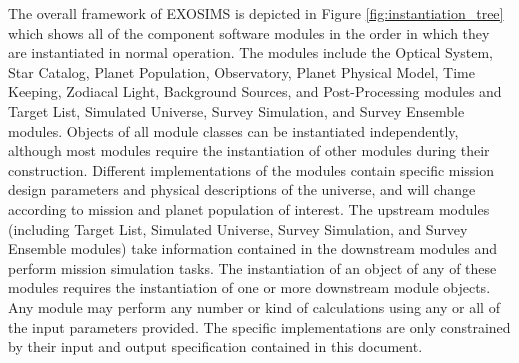 \documentclass[cleanfoot]{asme2ej}
\newcommand{\reffig}[1]{Figure \ref{#1}}
\begin{document}

The overall framework of EXOSIMS is depicted in \reffig{fig:instantiation_tree} which shows all of the component software modules in the order in which they are instantiated in normal operation. The modules include the Optical System, Star Catalog, Planet Population, Observatory, Planet Physical Model, Time Keeping, Zodiacal Light, Background Sources, and Post-Processing modules and Target List, Simulated Universe, Survey Simulation, and Survey Ensemble modules.  Objects of all module classes can be instantiated independently, although most modules require the instantiation of other modules during their construction. Different implementations of the modules contain specific mission design parameters and physical descriptions of the universe, and will change according to mission and planet population of interest.  The upstream modules (including Target List, Simulated Universe, Survey Simulation, and Survey Ensemble modules) take information contained in the downstream modules and perform mission simulation tasks. The instantiation of an object of any of these modules requires the instantiation of one or more downstream module objects.  Any module may perform any number or kind of calculations using any or all of the input parameters provided.  The specific implementations are only constrained by their input and output specification contained in this document.
\end{document}
